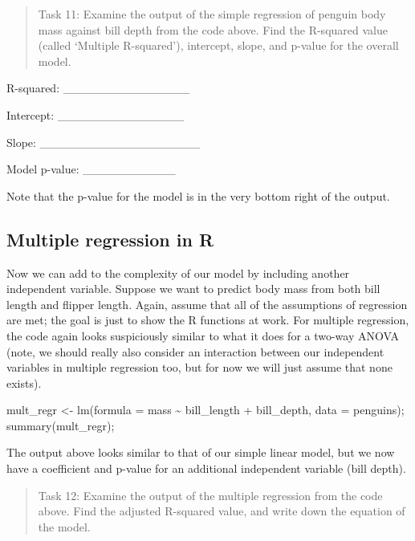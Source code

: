 \documentclass[
]{scrbook}
\newenvironment{Shaded}{\begin{snugshade}}{\end{snugshade}}
\newcommand{\AttributeTok}[1]{\textcolor[rgb]{0.77,0.63,0.00}{#1}}
\newcommand{\FunctionTok}[1]{\textcolor[rgb]{0.00,0.00,0.00}{#1}}
\newcommand{\NormalTok}[1]{#1}
\newcommand{\OtherTok}[1]{\textcolor[rgb]{0.56,0.35,0.01}{#1}}
\newcommand{\SpecialCharTok}[1]{\textcolor[rgb]{0.00,0.00,0.00}{#1}}
\begin{document}
\begin{quote}
Task 11: Examine the output of the simple regression of penguin body mass against bill depth from the code above. Find the R-squared value (called `Multiple R-squared'), intercept, slope, and p-value for the overall model.
\end{quote}

R-squared: \_\_\_\_\_\_\_\_\_\_\_\_\_\_\_

Intercept: \_\_\_\_\_\_\_\_\_\_\_\_\_\_\_

Slope: \_\_\_\_\_\_\_\_\_\_\_\_\_\_\_\_\_\_\_

Model p-value: \_\_\_\_\_\_\_\_\_\_\_

Note that the p-value for the model is in the very bottom right of the output.

\hypertarget{multiple-regression-in-r}{%
\subsection{Multiple regression in R}\label{multiple-regression-in-r}}

Now we can add to the complexity of our model by including another independent variable.
Suppose we want to predict body mass from both bill length and flipper length.
Again, assume that all of the assumptions of regression are met; the goal is just to show the R functions at work.
For multiple regression, the code again looks suspiciously similar to what it does for a two-way ANOVA (note, we should really also consider an interaction between our independent variables in multiple regression too, but for now we will just assume that none exists).

\begin{Shaded}
\begin{Highlighting}[]
\NormalTok{mult\_regr }\OtherTok{\textless{}{-}} \FunctionTok{lm}\NormalTok{(}\AttributeTok{formula =}\NormalTok{ mass }\SpecialCharTok{\textasciitilde{}}\NormalTok{ bill\_length }\SpecialCharTok{+}\NormalTok{ bill\_depth, }
                \AttributeTok{data =}\NormalTok{ penguins);}
\FunctionTok{summary}\NormalTok{(mult\_regr);}
\end{Highlighting}
\end{Shaded}

The output above looks similar to that of our simple linear model, but we now have a coefficient and p-value for an additional independent variable (bill depth).

\begin{quote}
Task 12: Examine the output of the multiple regression from the code above. Find the adjusted R-squared value, and write down the equation of the model.
\end{quote}
\end{document}
